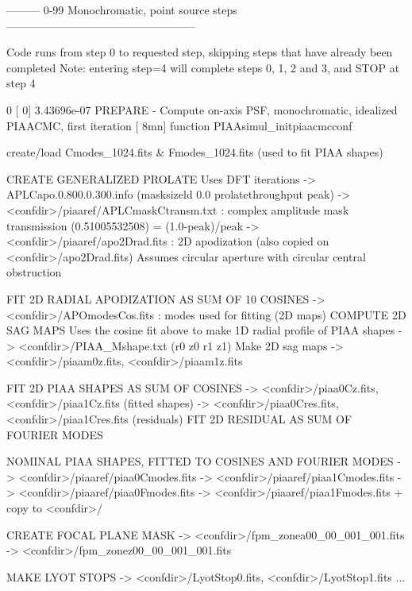 \begin{DoxyVerb}
\begin{DoxyVerb}
\begin{DoxyVerb}
--------- 0-99  Monochromatic, point source steps ---------------------------------------------------

Code runs from step 0 to requested step, skipping steps that have already been completed
Note: entering step=4 will complete steps 0, 1, 2 and 3, and STOP at step 4

  0     [  0]   3.43696e-07 PREPARE - Compute on-axis PSF, monochromatic, idealized PIAACMC, first iteration  [   8mn]
        function PIAAsimul_initpiaacmcconf
        {
            create/load Cmodes_1024.fits & Fmodes_1024.fits (used to fit PIAA shapes)

            CREATE GENERALIZED PROLATE
            Uses DFT iterations
            -> APLCapo.0.800.0.300.info  (masksizeld 0.0 prolatethroughput peak)
            -> <confdir>/piaaref/APLCmaskCtransm.txt : complex amplitude mask transmission (0.51005532508) = (1.0-peak)/peak
            -> <confdir>/piaaref/apo2Drad.fits : 2D apodization (also copied on <confdir>/apo2Drad.fits)
            Assumes circular aperture with circular central obstruction
                    
            FIT 2D RADIAL APODIZATION AS SUM OF 10 COSINES      
            -> <confdir>/APOmodesCos.fits : modes used for fitting (2D maps)        
            COMPUTE 2D SAG MAPS
            Uses the cosine fit above to make 1D radial profile of PIAA shapes
            -> <confdir>/PIAA_Mshape.txt (r0 z0 r1 z1)
            Make 2D sag maps
            -> <confdir>/piaam0z.fits, <confdir>/piaam1z.fits

            FIT 2D PIAA SHAPES AS SUM OF COSINES
            -> <confdir>/piaa0Cz.fits, <confdir>/piaa1Cz.fits (fitted shapes)
            -> <confdir>/piaa0Cres.fits, <confdir>/piaa1Cres.fits (residuals)
            FIT 2D RESIDUAL AS SUM OF FOURIER MODES

            NOMINAL PIAA SHAPES, FITTED TO COSINES AND FOURIER MODES
            -> <confdir>/piaaref/piaa0Cmodes.fits
            -> <confdir>/piaaref/piaa1Cmodes.fits
            -> <confdir>/piaaref/piaa0Fmodes.fits
            -> <confdir>/piaaref/piaa1Fmodes.fits
            + copy to <confdir>/
        
            CREATE FOCAL PLANE MASK
            -> <confdir>/fpm_zonea00_00_001_001.fits    
            -> <confdir>/fpm_zonez00_00_001_001.fits    

            MAKE LYOT STOPS
            -> <confdir>/LyotStop0.fits, <confdir>/LyotStop1.fits ...
        }
        

\end{DoxyVerb}
\end{DoxyVerb}
\end{DoxyVerb}
